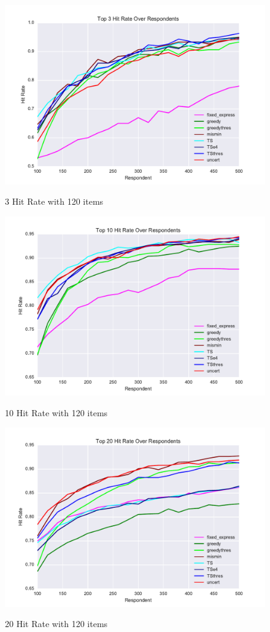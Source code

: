 \documentclass[nonblindrev]{informs3}
\begin{document}
\begin{figure}
\caption{3 Hit Rate with 120 items}
\includegraphics[width=1\textwidth]{plots/hr120v20k3.pdf}
\label{fig:3hit}
\end{figure}
\begin{figure}
\caption{10 Hit Rate with 120 items}
\includegraphics[width=1\textwidth]{plots/hr120v20k10.pdf}
\label{fig:10hit}
\end{figure}
\begin{figure}
\caption{20 Hit Rate with 120 items}
\includegraphics[width=1\textwidth]{plots/hr120v20k20.pdf}
\label{fig:20hit}
\end{figure}
\end{document}
